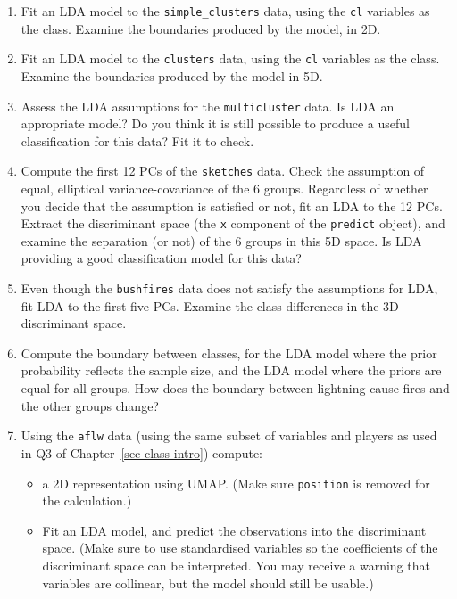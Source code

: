 \documentclass[
  letterpaper,
]{krantz}
\providecommand{\tightlist}{%
  \setlength{\itemsep}{0pt}\setlength{\parskip}{0pt}}
\begin{document}
\begin{enumerate}
\def\labelenumi{\arabic{enumi}.}
\setcounter{enumi}{4}
\item
  Fit an LDA model to the \texttt{simple\_clusters} data, using the
  \texttt{cl} variables as the class. Examine the boundaries produced by
  the model, in 2D.
\item
  Fit an LDA model to the \texttt{clusters} data, using the \texttt{cl}
  variables as the class. Examine the boundaries produced by the model
  in 5D.
\item
  Assess the LDA assumptions for the \texttt{multicluster} data. Is LDA
  an appropriate model? Do you think it is still possible to produce a
  useful classification for this data? Fit it to check.
\item
  Compute the first 12 PCs of the \texttt{sketches} data. Check the
  assumption of equal, elliptical variance-covariance of the 6 groups.
  Regardless of whether you decide that the assumption is satisfied or
  not, fit an LDA to the 12 PCs. Extract the discriminant space (the
  \texttt{x} component of the \texttt{predict} object), and examine the
  separation (or not) of the 6 groups in this 5D space. Is LDA providing
  a good classification model for this data?
\item
  Even though the \texttt{bushfires} data does not satisfy the
  assumptions for LDA, fit LDA to the first five PCs. Examine the class
  differences in the 3D discriminant space.
\item
  Compute the boundary between classes, for the LDA model where the
  prior probability reflects the sample size, and the LDA model where
  the priors are equal for all groups. How does the boundary between
  lightning cause fires and the other groups change?
\item
  Using the \texttt{aflw} data (using the same subset of variables and
  players as used in Q3 of Chapter~\ref{sec-class-intro}) compute:

  \begin{itemize}
  \tightlist
  \item
    a 2D representation using UMAP. (Make sure \texttt{position} is
    removed for the calculation.)
  \item
    Fit an LDA model, and predict the observations into the discriminant
    space. (Make sure to use standardised variables so the coefficients
    of the discriminant space can be interpreted. You may receive a
    warning that variables are collinear, but the model should still be
    usable.)
  \end{itemize}


\end{enumerate}
\end{document}
